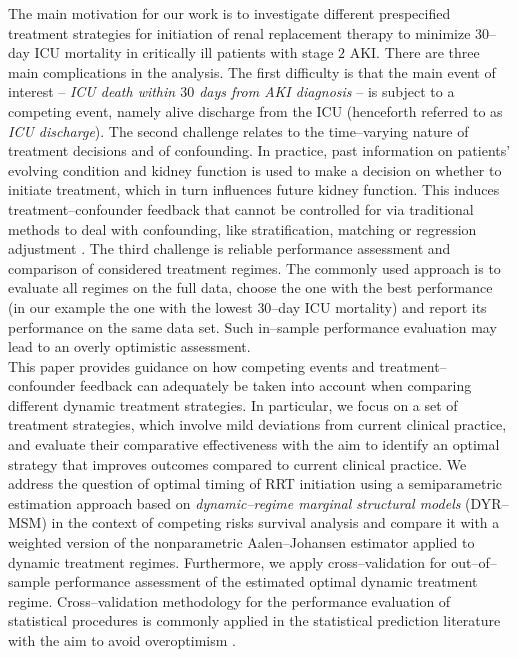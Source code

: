 \documentclass[12pt]{article}
\begin{document}
The main motivation for our work is to investigate different prespecified treatment strategies for initiation of renal replacement therapy to minimize $30$--day ICU mortality in critically ill patients with stage $2$ AKI. There are three main complications in the analysis. The first difficulty is that the main event of interest -- \emph{ICU death within $30$ days from AKI diagnosis} -- is subject to a competing event, namely alive discharge from the ICU (henceforth referred to as \emph{ICU discharge}). The second challenge relates to the time--varying nature of treatment decisions and of confounding. In practice, past information on patients' evolving condition and kidney function is used to make a decision on whether to initiate treatment, which in turn influences future kidney function. This induces treatment--confounder feedback that cannot be controlled for via traditional methods to deal with confounding, like stratification, matching or regression adjustment \citep{Hernan2020}. The third challenge is reliable performance assessment and comparison of considered treatment regimes. The commonly used approach is to evaluate all regimes on the full data, choose the one with the best performance (in our example the one with the lowest $30$--day ICU mortality) and report its performance on the same data set.  Such in--sample performance evaluation may lead to an overly optimistic assessment. 
\\
\indent
This paper provides guidance on how competing events and treatment--confounder feedback can adequately be taken into account when comparing different dynamic treatment strategies. In particular, we focus on a set of treatment strategies, which involve mild deviations from current clinical practice, and evaluate their comparative effectiveness with the aim to identify an optimal strategy that improves outcomes compared to current clinical practice. We address the question of optimal timing of RRT initiation using a semiparametric estimation approach based on \emph{dynamic--regime marginal structural models} (DYR--MSM) \citep{Murphy2001, VanderLaan2007, Orellana2010} in the context of competing risks survival analysis and compare it with a weighted version of the nonparametric Aalen--Johansen estimator \citep{Aalen1978} applied to dynamic treatment regimes. Furthermore, we apply cross--validation for out--of--sample performance assessment of the estimated optimal dynamic treatment regime. Cross--validation methodology for the performance evaluation of statistical procedures is commonly applied in the statistical prediction literature with the aim to avoid overoptimism \citep{Stone1974,  Harrell1996, Steyerberg2001, Dudoit2005, Hastie2009, Smith2014, VanderLaan2014}. 
\end{document}
